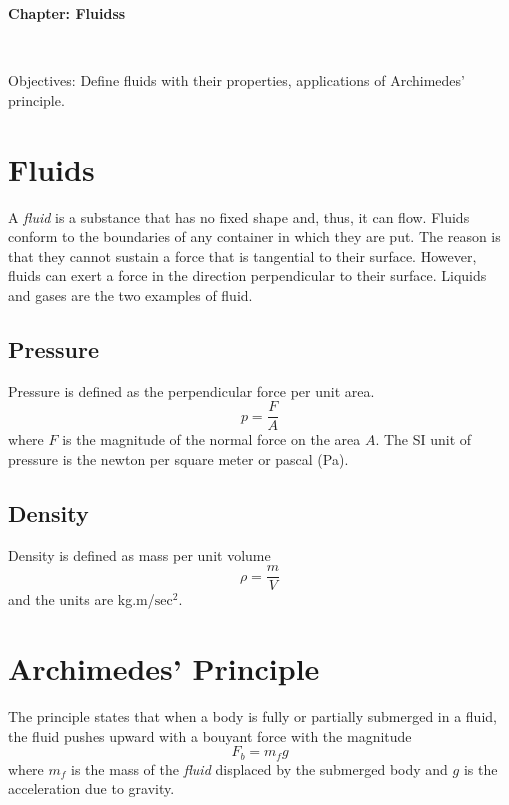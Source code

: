 \documentclass[10pt]{article}
\date{2014-6-22}
\begin{document}
\begin{center}
\begin{Large}\textbf{Chapter: Fluidss}\end{Large} \\
\smallskip
\end{center}
Objectives: Define fluids with their properties, applications of Archimedes' principle.
\section{Fluids}
A \emph{fluid} is a substance that has no fixed shape and, thus, it can flow.  Fluids conform to the boundaries of any container in which they are put.  The reason is that they cannot sustain a force that is tangential to their surface.  However, fluids can exert a force in the direction perpendicular to their surface.  Liquids and gases are the two examples of fluid.
\subsection{Pressure}
Pressure is defined as the perpendicular force per unit area.  
\begin{equation}
  p=\frac{F}{A}
\end{equation}
where $F$ is the magnitude of the normal force on the area $A$.  The SI unit of pressure is the newton per square meter or pascal (Pa).
\subsection{Density}
Density is defined as mass per unit volume
\begin{equation}
  \rho = \frac{m}{V}
\end{equation}
and the units are kg.m/$\text{sec}^2$.  

\section{Archimedes' Principle}
The principle states that when a body is fully or partially submerged in a fluid, the fluid pushes upward with a bouyant force with the magnitude
\begin{equation}
\label{bouyequation}
  F_b=m_fg
\end{equation}
where $m_f$ is the mass of the \emph{fluid} displaced by the submerged body and $g$ is the acceleration due to gravity.
\end{document}
